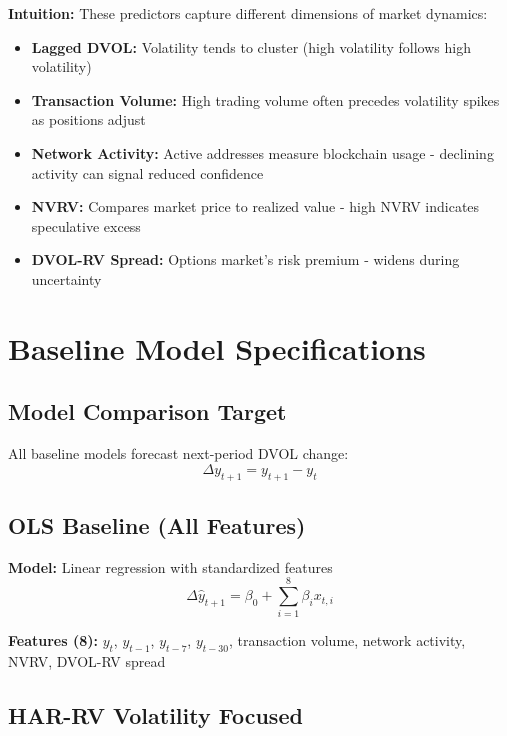 \documentclass{article}
\begin{document}
\textbf{Intuition:} These predictors capture different dimensions of market dynamics:
\begin{itemize}
\item \textbf{Lagged DVOL:} Volatility tends to cluster (high volatility follows high volatility)
\item \textbf{Transaction Volume:} High trading volume often precedes volatility spikes as positions adjust
\item \textbf{Network Activity:} Active addresses measure blockchain usage - declining activity can signal reduced confidence
\item \textbf{NVRV:} Compares market price to realized value - high NVRV indicates speculative excess
\item \textbf{DVOL-RV Spread:} Options market's risk premium - widens during uncertainty
\end{itemize}

\section{Baseline Model Specifications}

\subsection{Model Comparison Target}

All baseline models forecast next-period DVOL change:
\begin{equation}
\Delta y_{t+1} = y_{t+1} - y_t
\end{equation}

\subsection{OLS Baseline (All Features)}

\textbf{Model:} Linear regression with standardized features
\begin{equation}
\Delta \hat{y}_{t+1} = \beta_0 + \sum_{i=1}^{8} \beta_i x_{t,i}
\end{equation}

\textbf{Features (8):} $y_t$, $y_{t-1}$, $y_{t-7}$, $y_{t-30}$, transaction volume, network activity, NVRV, DVOL-RV spread

\subsection{HAR-RV Volatility Focused}
\end{document}
